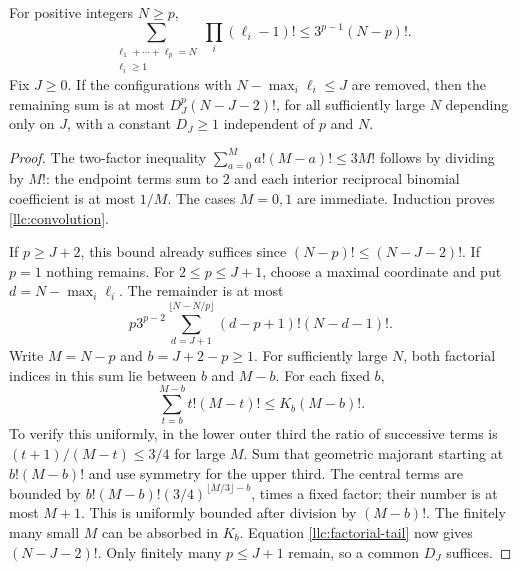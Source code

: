 \begin{lemma}\label{llc:vertices}
For positive integers $N\ge p$,
\begin{equation}\label{llc:convolution}
 \sum_{\substack{\ell_1+\cdots+\ell_p=N\\\ell_i\ge1}}
                 \prod_i(\ell_i-1)!\le3^{p-1}(N-p)!.
\end{equation}
Fix $J\ge0$. If the configurations with
$N-\max_i\ell_i\le J$ are removed, then the remaining sum is at most
$D_J^p(N-J-2)!$, for all sufficiently large $N$ depending only on $J$,
with a constant $D_J\ge1$ independent of $p$ and $N$.
\end{lemma}
\begin{proof}
The two-factor inequality
$\sum_{a=0}^M a!(M-a)!\le3M!$ follows by dividing by $M!$:
the endpoint terms sum to $2$ and each interior reciprocal binomial
coefficient is at most $1/M$. The cases $M=0,1$ are immediate.
Induction proves \eqref{llc:convolution}.

If $p\ge J+2$, this bound already suffices since
$(N-p)!\le(N-J-2)!$. If $p=1$ nothing remains.
For $2\le p\le J+1$, choose a maximal coordinate and put
$d=N-\max_i\ell_i$. The remainder is at most
\[
 p3^{p-2}\sum_{d=J+1}^{\lfloor N-N/p\rfloor}
                    (d-p+1)!(N-d-1)!.
\]
Write $M=N-p$ and $b=J+2-p\ge1$. For sufficiently large $N$,
both factorial indices in this sum lie between $b$ and $M-b$.
For each fixed $b$,
\begin{equation}\label{llc:factorial-tail}
 \sum_{t=b}^{M-b}t!(M-t)!\le K_b(M-b)!.
\end{equation}
To verify this uniformly, in the lower outer third the ratio of
successive terms is $(t+1)/(M-t)\le3/4$ for large $M$.
Sum that geometric majorant starting at $b!(M-b)!$ and use symmetry
for the upper third. The central terms are bounded by
$b!(M-b)!(3/4)^{\lfloor M/3\rfloor-b}$, times a fixed factor;
their number is at most $M+1$. This is uniformly bounded after division
by $(M-b)!$. The finitely many small $M$ can be absorbed in $K_b$.
Equation \eqref{llc:factorial-tail} now gives $(N-J-2)!$.
Only finitely many $p\le J+1$ remain, so a common $D_J$ suffices.
\end{proof}

